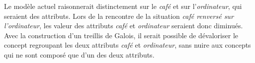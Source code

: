 Le modèle \cogito{} actuel raisonnerait distinctement sur le \emph{café} et sur l'\emph{ordinateur}, qui seraient des attributs. Lors de la rencontre de la situation \emph{café renversé sur l'ordinateur}, les valeur des attributs \emph{café} et \emph{ordinateur} seraient donc diminués. Avec la construction d'un treillis de Galois, il serait possible de dévaloriser le concept regroupant les deux attributs \emph{café} et \emph{ordinateur}, sans nuire aux concepts qui ne sont composé que d'un des deux attributs.